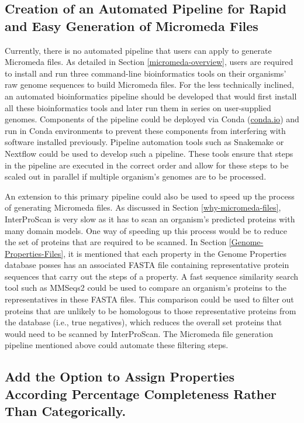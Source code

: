 \subsection{Creation of an Automated Pipeline for Rapid and Easy Generation of Micromeda Files} \label{pipeline-development}

Currently, there is no automated pipeline that users can apply to generate Micromeda files. As detailed in Section \ref{micromeda-overview}, users are required to install and run three command-line bioinformatics tools on their organisms' raw genome sequences to build Micromeda files. For the less technically inclined, an automated bioinformatics pipeline should be developed that would first install all these bioinformatics tools and later run them in series on user-supplied genomes. Components of the pipeline could be deployed via Conda (\href{conda.io}{conda.io}) and run in Conda environments to prevent these components from interfering with software installed previously. Pipeline automation tools such as Snakemake \cite{koster2012snakemake} or Nextflow \cite{di2017nextflow} could be used to develop such a pipeline. These tools ensure that steps in the pipeline are executed in the correct order and allow for these steps to be scaled out in parallel if multiple organism's genomes are to be processed.

An extension to this primary pipeline could also be used to speed up the process of generating Micromeda files. As discussed in Section \ref{why-micromeda-files}, InterProScan is very slow as it has to scan an organism's predicted proteins with many domain models. One way of speeding up this process would be to reduce the set of proteins that are required to be scanned. In Section \ref{Genome-Properties-Files}, it is mentioned that each property in the Genome Properties database posses has an associated FASTA file containing representative protein sequences that carry out the steps of a property. A fast sequence similarity search tool such as MMSeqs2 \cite{steinegger2017mmseqs2} could be used to compare an organism's proteins to the representatives in these FASTA files. This comparison could be used to filter out proteins that are unlikely to be homologous to those representative proteins from the database (i.e., true negatives), which reduces the overall set proteins that would need to be scanned by InterProScan. The Micromeda file generation pipeline mentioned above could automate these filtering steps.

\subsection{Add the Option to Assign Properties According Percentage Completeness Rather Than Categorically.}

